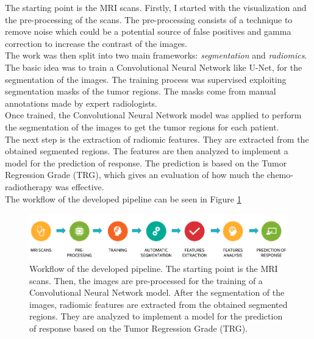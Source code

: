 \documentclass{standalone}
\begin{document}
The starting point is the MRI scans. 
Firstly, I started with the visualization and the pre-processing of the scans.
The pre-processing consists of a technique to remove noise which could be a potential source of false positives and gamma correction to increase the contrast of the images.
\\
The work was then split into two main frameworks: \textit{segmentation} and \textit{radiomics}.
The basic idea was to train a Convolutional Neural Network like U-Net, for the segmentation of the images.
The training process was supervised exploiting segmentation masks of the tumor regions.
The masks come from manual annotations made by expert radiologists.
\\
Once trained, the Convolutional Neural Network model was applied to perform the segmentation of the images to get the tumor regions for each patient.
\\
The next step is the extraction of radiomic features.
They are extracted from the obtained segmented regions.
The features are then analyzed to implement a model for the prediction of response.
The prediction is based on the Tumor Regression Grade (TRG), which gives an evaluation of how much the chemo-radiotherapy was effective.
\\
The workflow of the developed pipeline can be seen in Figure \ref{workflow}
\begin{figure}[htp]

    \centering
    \includegraphics[width=\textwidth]{../images/finalworkflow.png}
    
    \caption{Workflow of the developed pipeline. The starting point is the MRI scans. Then, the images are pre-processed for the training of a Convolutional Neural Network model. After the segmentation of the images, radiomic features are extracted from the obtained segmented regions. They are analyzed to implement a model for the prediction of response based on the Tumor Regression Grade (TRG).}
    \label{workflow}
    
    \end{figure}
\end{document}
